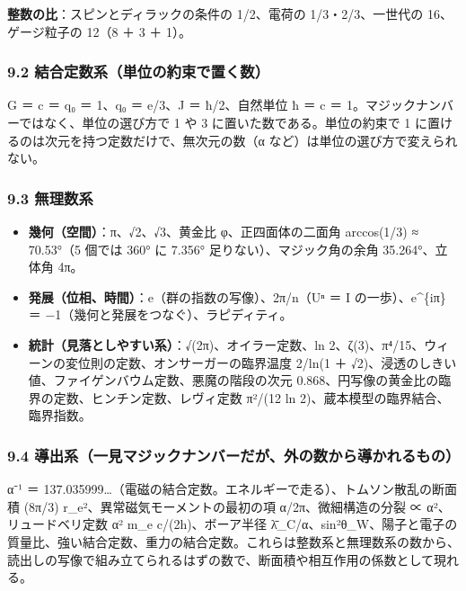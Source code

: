 \documentclass[
  a4paper,
]{ltjsarticle}
\providecommand{\tightlist}{%
  \setlength{\itemsep}{0pt}\setlength{\parskip}{0pt}}
\begin{document}
\textbf{整数の比}：スピンとディラックの条件の 1/2、電荷の
1/3・2/3、一世代の 16、ゲージ粒子の 12（8 ＋ 3 ＋ 1）。

\subsubsection{9.2
結合定数系（単位の約束で置く数）}\label{ux7d50ux5408ux5b9aux6570ux7cfbux5358ux4f4dux306eux7d04ux675fux3067ux7f6eux304fux6570}

G ＝ c ＝ q₀ ＝ 1、q₀ ＝ e/3、J ＝ ħ/2、自然単位 ħ ＝ c ＝
1。マジックナンバーではなく、単位の選び方で 1 や 3
に置いた数である。単位の約束で 1
に置けるのは次元を持つ定数だけで、無次元の数（α
など）は単位の選び方で変えられない。

\subsubsection{9.3 無理数系}\label{ux7121ux7406ux6570ux7cfb}

\begin{itemize}
\tightlist
\item
  \textbf{幾何（空間）}：π、√2、√3、黄金比 φ、正四面体の二面角
  arccos(1/3) ≈ 70.53°（5 個では 360° に 7.356°
  足りない）、マジック角の余角 35.264°、立体角 4π。
\item
  \textbf{発展（位相、時間）}：e（群の指数の写像）、2π/n（Uⁿ ＝ I
  の一歩）、e\^{}\{iπ\} ＝ −1（幾何と発展をつなぐ）、ラピディティ。
\item
  \textbf{統計（見落としやすい系）}：√(2π)、オイラー定数、ln
  2、ζ(3)、π⁴/15、ウィーンの変位則の定数、オンサーガーの臨界温度 2/ln(1
  ＋ √2)、浸透のしきい値、ファイゲンバウム定数、悪魔の階段の次元
  0.868、円写像の黄金比の臨界の定数、ヒンチン定数、レヴィ定数 π²/(12 ln
  2)、蔵本模型の臨界結合、臨界指数。
\end{itemize}

\subsubsection{9.4
導出系（一見マジックナンバーだが、外の数から導かれるもの）}\label{ux5c0eux51faux7cfbux4e00ux898bux30deux30b8ux30c3ux30afux30caux30f3ux30d0ux30fcux3060ux304cux5916ux306eux6570ux304bux3089ux5c0eux304bux308cux308bux3082ux306e}

α⁻¹ ＝
137.035999\ldots（電磁の結合定数。エネルギーで走る）、トムソン散乱の断面積
(8π/3) r\_e²、異常磁気モーメントの最初の項 α/2π、微細構造の分裂 ∝
α²、リュードベリ定数 α² m\_e c/(2h)、ボーア半径
λ̄\_C/α、sin²θ\_W、陽子と電子の質量比、強い結合定数、重力の結合定数。これらは整数系と無理数系の数から、読出しの写像で組み立てられるはずの数で、断面積や相互作用の係数として現れる。
\end{document}
